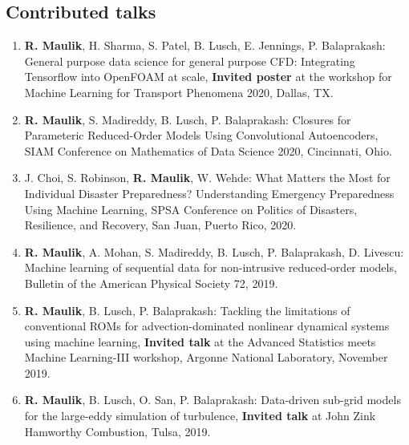 \documentclass[letterpaper]{article}
\begin{document}
\subsection*{Contributed talks}

\begin{enumerate}

\item \textbf{R. Maulik}, H. Sharma, S. Patel, B. Lusch, E. Jennings, P. Balaprakash: General purpose data science for general purpose CFD: Integrating Tensorflow into OpenFOAM at scale, \textbf{Invited poster} at the workshop for Machine Learning for Transport Phenomena 2020, Dallas, TX.

\item \textbf{R. Maulik}, S. Madireddy, B. Lusch, P. Balaprakash: Closures for Parameteric Reduced-Order Models Using Convolutional Autoencoders, SIAM Conference on Mathematics of Data Science 2020, Cincinnati, Ohio.


\item J. Choi, S. Robinson, \textbf{R. Maulik}, W. Wehde: What Matters the Most for Individual Disaster Preparedness? Understanding Emergency Preparedness Using Machine Learning, SPSA Conference on Politics of Disasters, Resilience, and Recovery, San Juan, Puerto Rico, 2020.

\item \textbf{R. Maulik}, A. Mohan, S. Madireddy, B. Lusch, P. Balaprakash, D. Livescu: Machine learning of sequential data for non-intrusive reduced-order models, Bulletin of the American Physical Society 72, 2019.

\item \textbf{R. Maulik}, B. Lusch, P. Balaprakash: Tackling the limitations of conventional ROMs for advection-dominated nonlinear dynamical systems using machine learning, \textbf{Invited talk} at the Advanced Statistics meets Machine Learning-III workshop, Argonne National Laboratory, November 2019.

\item \textbf{R. Maulik}, B. Lusch, O. San, P. Balaprakash: Data-driven sub-grid models for the large-eddy simulation of turbulence, \textbf{Invited talk} at John Zink Hamworthy Combustion, Tulsa, 2019.


\end{enumerate}
\end{document}
